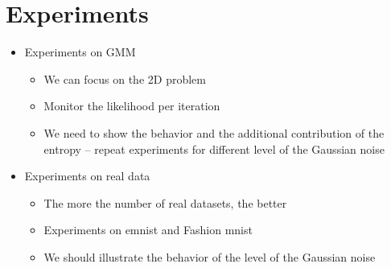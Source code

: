 
\section{Experiments}

\begin{itemize}
\item Experiments on GMM
\begin{itemize}
\item We can focus on the 2D problem
\item Monitor the likelihood per iteration
\item We need to show the behavior and the additional contribution of the entropy -- repeat experiments for different level of the Gaussian noise
\end{itemize}
\item Experiments on real data
\begin{itemize}
\item The more the number of real datasets, the better
\item Experiments on emnist and Fashion mnist
\item We should illustrate the behavior of the level of the Gaussian noise
\end{itemize}
\end{itemize}
